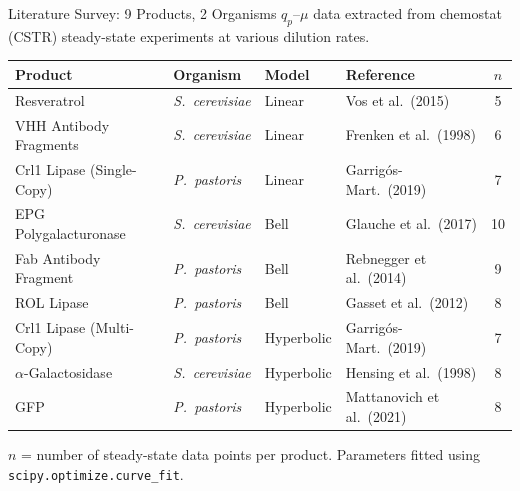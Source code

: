 \documentclass[aspectratio=169, 11pt]{beamer}
\begin{document}
\begin{frame}{Literature Survey: 9 Products, 2 Organisms}
  \vspace{-0.1cm}
  {\small $q_p$--$\mu$ data extracted from chemostat (CSTR) steady-state experiments at various dilution rates.}

  \vspace{0.2cm}
  \begin{center}
  \renewcommand{\arraystretch}{1.15}
  {\footnotesize
  \begin{tabular}{llllc}
    \toprule
    \textbf{Product} & \textbf{Organism} & \textbf{Model} & \textbf{Reference} & \textbf{$n$} \\
    \midrule
    Resveratrol              & \textit{S.\ cerevisiae} & Linear     & Vos et al.\ (2015)              & 5 \\
    VHH Antibody Fragments   & \textit{S.\ cerevisiae} & Linear     & Frenken et al.\ (1998)          & 6 \\
    Crl1 Lipase (Single-Copy) & \textit{P.\ pastoris}  & Linear     & Garrig\'{o}s-Mart.\ (2019)      & 7 \\
    \midrule
    EPG Polygalacturonase    & \textit{S.\ cerevisiae} & Bell       & Glauche et al.\ (2017)          & 10 \\
    Fab Antibody Fragment    & \textit{P.\ pastoris}   & Bell       & Rebnegger et al.\ (2014)        & 9 \\
    ROL Lipase               & \textit{P.\ pastoris}   & Bell       & Gasset et al.\ (2012)           & 8 \\
    \midrule
    Crl1 Lipase (Multi-Copy)  & \textit{P.\ pastoris}  & Hyperbolic & Garrig\'{o}s-Mart.\ (2019)      & 7 \\
    $\alpha$-Galactosidase    & \textit{S.\ cerevisiae} & Hyperbolic & Hensing et al.\ (1998)          & 8 \\
    GFP                      & \textit{P.\ pastoris}   & Hyperbolic & Mattanovich et al.\ (2021)      & 8 \\
    \bottomrule
  \end{tabular}
  }
  \end{center}

  \vspace{0.1cm}
  {\small $n$ = number of steady-state data points per product. Parameters fitted using \texttt{scipy.optimize.curve\_fit}.}
\end{frame}
\end{document}
